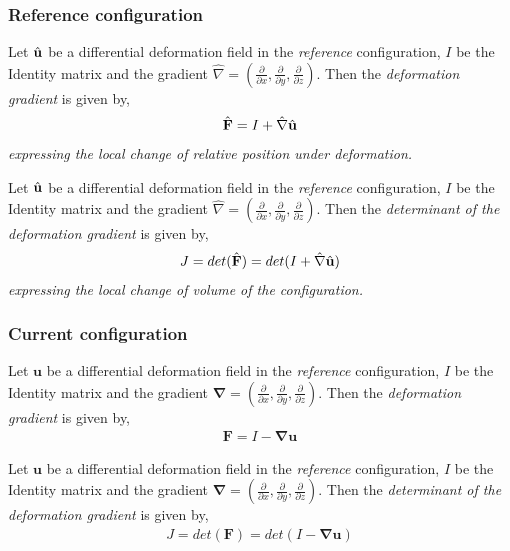 \begin{appendices}
\subsubsection*{Reference configuration}
\begin{defn}
Let $\hat{\mathbf{u}}$ be a differential deformation field in the \textit{reference} configuration, $I$ be the Identity matrix and
the gradient $\hat{\nabla} = (\frac{\partial}{\partial x}, \frac{\partial}{\partial y}, \frac{\partial}{\partial z}) $. Then the \textit{deformation gradient} is given by,
\begin{align}
\hat{\mathbf{F}} = I + \hat{\nabla} \hat{\mathbf{u}} 
\end{align} 
\textit{expressing the local change of relative position under deformation.}
\end{defn}
\begin{defn}
Let $\hat{\mathbf{u}}$ be a differential deformation field in the \textit{reference} configuration, $I$ be the Identity matrix and
the gradient $\hat{\nabla} = (\frac{\partial}{\partial x}, \frac{\partial}{\partial y}, \frac{\partial}{\partial z}) $. Then the \textit{determinant of the deformation gradient} is given by,
\begin{align}
J = det(\hat{\mathbf{F}}) = det( I + \hat{\nabla} \hat{\mathbf{u}} )
\end{align} 
\textit{expressing the local change of volume of the configuration.}
\end{defn}
\subsubsection*{Current configuration}
\begin{defn}
Let $\mathbf{u}$ be a differential deformation field in the \textit{reference} configuration, $I$ be the Identity matrix and
the gradient $\mathbf{\nabla} = (\frac{\partial}{\partial x}, \frac{\partial}{\partial y}, \frac{\partial}{\partial z}) $. Then the \textit{deformation gradient} is given by,
\begin{align}
\mathbf{F} = I - \mathbf{\nabla} \mathbf{u} 
\end{align} 
\end{defn}
\begin{defn}
Let $\mathbf{u}$ be a differential deformation field in the \textit{reference} configuration, $I$ be the Identity matrix and
the gradient $\mathbf{\nabla} = (\frac{\partial}{\partial x}, \frac{\partial}{\partial y}, \frac{\partial}{\partial z}) $. Then the \textit{determinant of the deformation gradient} is given by,
\begin{align}
J = det(\mathbf{F}) = det( I - \mathbf{\nabla} \mathbf{u} )
\end{align} 
\end{defn}
\end{appendices}
